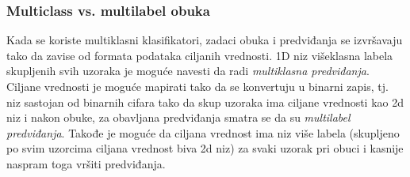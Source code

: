 \documentclass[fontsize=12bp, paper=a4]{scrarticle}
\begin{document}
\subsubsection{Multiclass vs. multilabel obuka}
Kada se koriste multiklasni klasifikatori, zadaci obuka i predviđanja se izvršavaju tako da zavise od formata podataka ciljanih vrednosti. 1D niz višeklasna labela skupljenih svih uzoraka je moguće navesti da radi \textit{multiklasna predviđanja}. Ciljane vrednosti je moguće mapirati tako da se konvertuju u binarni zapis, tj. niz sastojan od binarnih cifara tako da skup uzoraka ima ciljane vrednosti kao 2d niz i nakon obuke, za obavljana predviđanja smatra se da su \textit{multilabel predviđanja}. Takođe je moguće da ciljana vrednost ima niz više labela (skupljeno po svim uzorcima ciljana vrednost biva 2d niz) za svaki uzorak pri obuci i kasnije naspram toga vršiti predviđanja.

\vbox{}
\end{document}
